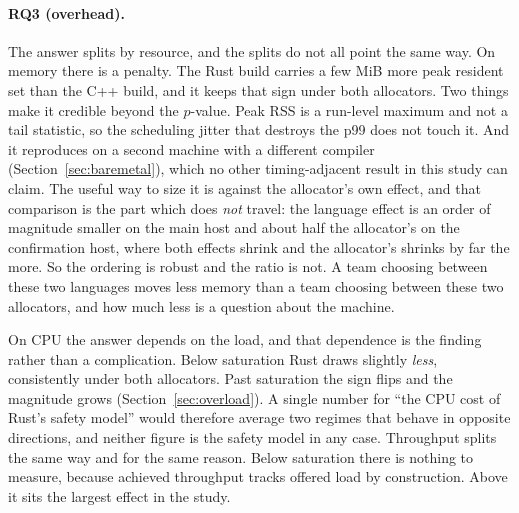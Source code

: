 \documentclass[english,oneside,a4paper,censored,csm,software-track-2020]{HYthesisML}
\begin{document}
\paragraph{RQ3 (overhead).} The answer splits by resource, and the splits do not all point the
same way. On memory there is a penalty. The Rust build carries a few MiB more peak resident set
than the C++ build, and it keeps that sign under both allocators. Two things make it credible
beyond the $p$-value. Peak RSS is a run-level maximum and not a
tail statistic, so the scheduling jitter that destroys the p99 does not touch it. And it reproduces
on a second machine with a different compiler (Section~\ref{sec:baremetal}), which no other
timing-adjacent result in this study can claim. The useful way to size it is against the allocator's
own effect, and that comparison is the part which does \emph{not} travel: the language effect is an
order of magnitude smaller on the main host and about half the allocator's on the confirmation host,
where both effects shrink and the allocator's shrinks by far the more. So the ordering is robust and
the ratio is not. A team choosing between these two languages moves less memory than a team choosing
between these two allocators, and how much less is a question about the machine.

On CPU the answer depends on the load, and that dependence is the finding rather than a
complication. Below saturation Rust draws slightly \emph{less}, consistently under both
allocators. Past saturation the sign flips and the magnitude grows
(Section~\ref{sec:overload}). A single number for ``the CPU cost of
Rust's safety model'' would therefore average two regimes that behave in opposite directions, and
neither figure is the safety model in any case. Throughput splits the same way and for the same
reason. Below saturation there is nothing to measure, because achieved throughput tracks offered
load by construction. Above it sits the largest effect in the study.
\end{document}
